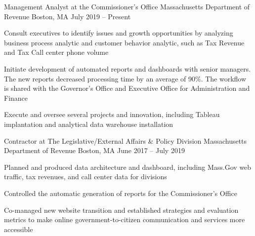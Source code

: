 

\begin{cventries}

  \cventry
    {Management Analyst at the Commissioner’s Office} %
    {Massachusetts Department of Revenue} %
    {Boston, MA} %
    {July 2019 – Present} %
    {
      \begin{cvitems} %
        \item {Consult executives to identify issues and growth opportunities by analyzing business process analytic and customer behavior analytic, such as Tax Revenue and Tax Call center phone volume}
        \item {Initiate development of automated reports and dashboards with senior managers. The new reports decreased processing time by an average of 90\%. The workflow is shared with the Governor’s Office and Executive Office for Administration and Finance}
        \item {Execute and oversee several projects and innovation, including Tableau implantation and analytical data warehouse installation}
      \end{cvitems}
    }
    
  \cventry
    {Contractor at The Legislative/External Affairs \& Policy Division} %
    {Massachusetts Department of Revenue} %
    {Boston, MA} %
    {June 2017 – July 2019} %
    {
      \begin{cvitems} %
        \item {Planned and produced data architecture and dashboard, including Mass.Gov web traffic, tax revenues, and call center data for divisions}
        \item {Controlled the automatic generation of reports for the Commissioner’s Office}
        \item {Co-managed new website transition and established strategies and evaluation metrics to make online government-to-citizen communication and services more accessible}
      \end{cvitems}
    }


\end{cventries}
